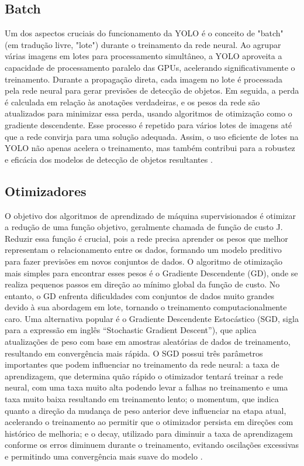 \subsection{Batch}
\label{sec:batch}

Um dos aspectos cruciais do funcionamento da YOLO é o conceito de "batch" (em tradução livre, "lote") durante o treinamento da rede neural. Ao agrupar várias imagens em lotes para processamento simultâneo, a YOLO aproveita a capacidade de processamento paralelo das GPUs, acelerando significativamente o treinamento. Durante a propagação direta, cada imagem no lote é processada pela rede neural para gerar previsões de detecção de objetos. Em seguida, a perda é calculada em relação às anotações verdadeiras, e os pesos da rede são atualizados para minimizar essa perda, usando algoritmos de otimização como o gradiente descendente. Esse processo é repetido para vários lotes de imagens até que a rede convirja para uma solução adequada. Assim, o uso eficiente de lotes na YOLO não apenas acelera o treinamento, mas também contribui para a robustez e eficácia dos modelos de detecção de objetos resultantes \cite{goodfellow2016deep}.

\subsection{Otimizadores}
\label{sec:otimizadores}

O objetivo dos algoritmos de aprendizado de máquina supervisionados é otimizar a redução de uma função objetivo, geralmente chamada de função de custo J. Reduzir essa função é crucial, pois a rede precisa aprender os pesos que melhor representam o relacionamento entre os dados, formando um modelo preditivo para fazer previsões em novos conjuntos de dados. O algoritmo de otimização mais simples para encontrar esses pesos é o Gradiente Descendente (GD), onde se realiza pequenos passos em direção ao mínimo global da função de custo. No entanto, o GD enfrenta dificuldades com conjuntos de dados muito grandes devido à sua abordagem em lote, tornando o treinamento computacionalmente caro. Uma alternativa popular é o Gradiente Descendente Estocástico (SGD, sigla para a expressão em inglês “Stochastic Gradient Descent”), que aplica atualizações de peso com base em amostras aleatórias de dados de treinamento, resultando em convergência mais rápida. O  SGD possui três parâmetros importantes que podem influenciar no treinamento da rede neural: a taxa de aprendizagem, que determina quão rápido o otimizador tentará treinar a rede neural, com uma taxa muito alta podendo levar a falhas no treinamento e uma taxa muito baixa resultando em treinamento lento; o momentum, que indica quanto a direção da mudança de peso anterior deve influenciar na etapa atual, acelerando o treinamento ao permitir que o otimizador persista em direções com histórico de melhoria; e o decay, utilizado para diminuir a taxa de aprendizagem conforme os erros diminuem durante o treinamento, evitando oscilações excessivas e permitindo uma convergência mais suave do modelo \cite{silva2018estudo}.

